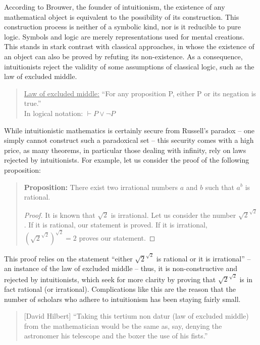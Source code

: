 \documentclass{article}
\begin{document}
According to Brouwer, the founder of intuitionism, the existence of any mathematical object is equivalent to the possibility of its construction. 
This construction process is neither of a symbolic kind, nor is it reducible to pure logic. Symbols and logic are merely representations used for mental creations.
This stands in stark contrast with classical approaches, in whose the existence of an object can also be proved by refuting its non-existence. As a consequence, intuitionists reject the validity of some assumptions of classical logic, such as the law of excluded middle.
\begin{quote}
\underline{Law of excluded middle:} ``For any proposition P, either P or its negation is true.''\\ 
In logical notation: $\vdash P\lor\lnot P$
\end{quote}
While intuitionistic mathematics is certainly secure from Russell's paradox -- one simply cannot construct such a paradoxical set -- this security comes with a high price, as many theorems, in particular those dealing with infinity, rely on laws rejected by intuitionists. For example, let us consider the proof of the following proposition:
\begin{quote}
\textbf{Proposition:} There exist two irrational numbers $a$ and $b$ such that $a^b$ is rational.
\vspace{-2em}
\begin{proof}
	It is known that $\sqrt{2}$ is irrational. Let us consider the number $\sqrt{2}^{\sqrt{2}}$. If it is rational, our statement is proved. If it is irrational, $(\sqrt{2}^{\sqrt{2}})^{\sqrt{2}}=2$ proves our statement.
\end{proof}
\end{quote}
This proof relies on the statement ``either $\sqrt{2}^{\sqrt{2}}$ is rational or it is irrational'' -- an instance of the law of excluded middle -- thus, it is non-constructive and rejected by intuitionists, which seek for more clarity by proving that $\sqrt{2}^{\sqrt{2}}$ is in fact rational (or irrational). Complications like this are the reason that the number of scholars who adhere to intuitionism has been staying fairly small.

\begin{quote}[David Hilbert]
``Taking this tertium non datur (law of excluded middle) from the mathematician would be the same as, say, denying the astronomer his telescope and the boxer the use of his fists.''\cite{hilbert_tertium_non_datur}
\end{quote}
\end{document}
